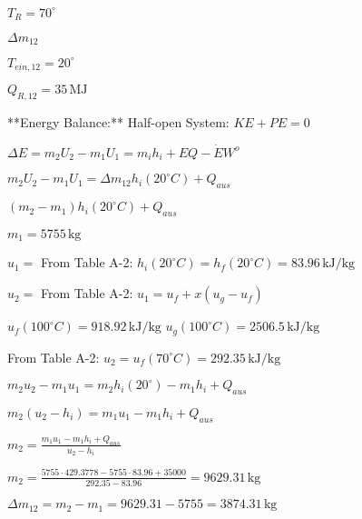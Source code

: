 \( T_R = 70^\circ \)  

\( \Delta m_{12} \)  

\( T_{ein,12} = 20^\circ \)  

\( Q_{R,12} = 35 \, \text{MJ} \)  

**Energy Balance:**  
Half-open System:  
\( KE + PE = 0 \)  

\( \Delta E = m_2 U_2 - m_1 U_1 = m_i h_i + EQ - \dot{E}W^o \)  

\( m_2 U_2 - m_1 U_1 = \Delta m_{12} h_i(20^\circ C) + Q_{aus} \)  

\( (m_2 - m_1) h_i(20^\circ C) + Q_{aus} \)  

\( m_1 = 5755 \, \text{kg} \)  

\( u_1 = \)  
From Table A-2:  
\( h_i(20^\circ C) = h_{f}(20^\circ C) = 83.96 \, \text{kJ/kg} \)  

\( u_2 = \)  
From Table A-2:  
\( u_1 = u_f + x (u_g - u_f) \)  

\( u_f(100^\circ C) = 918.92 \, \text{kJ/kg} \)  
\( u_g(100^\circ C) = 2506.5 \, \text{kJ/kg} \)  

From Table A-2:  
\( u_2 = u_f(70^\circ C) = 292.35 \, \text{kJ/kg} \)  

\( m_2 u_2 - m_1 u_1 = m_2 h_i(20^\circ) - m_1 h_i + Q_{aus} \)  

\( m_2 (u_2 - h_i) = m_1 u_1 - m_1 h_i + Q_{aus} \)  

\( m_2 = \frac{m_1 u_1 - m_1 h_i + Q_{aus}}{u_2 - h_i} \)  

\( m_2 = \frac{5755 \cdot 429.3778 - 5755 \cdot 83.96 + 35000}{292.35 - 83.96} = 9629.31 \, \text{kg} \)  

\( \Delta m_{12} = m_2 - m_1 = 9629.31 - 5755 = 3874.31 \, \text{kg} \)